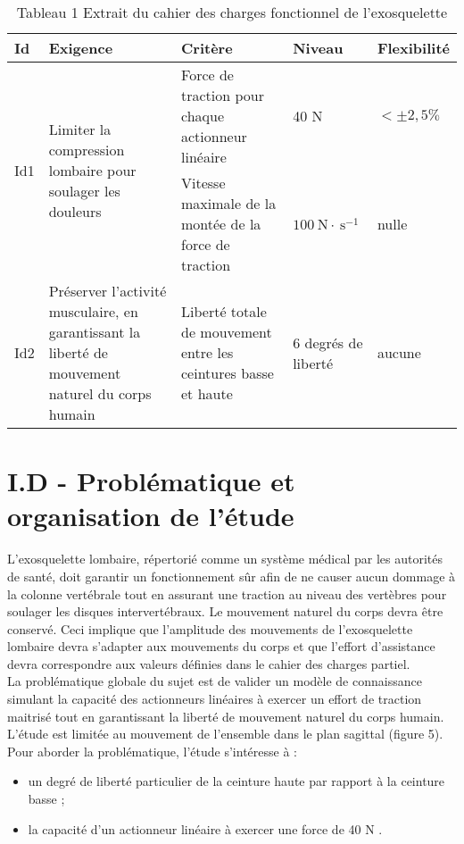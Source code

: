 \begin{table}[h]
\begin{center}
\begin{tabular}{|l|l|l|l|l|}
\hline
Id & Exigence & Critère & Niveau & Flexibilité \\
\hline
\multirow[t]{2}{*}{Id1} & \multirow[t]{2}{*}{Limiter la compression lombaire pour soulager les douleurs} & Force de traction pour chaque actionneur linéaire & 40 N & $< \pm 2,5 \%$ \\
\hline
 &  & Vitesse maximale de la montée de la force de traction & $100 \mathrm{~N} \cdot \mathrm{~s}^{-1}$ & nulle \\
\hline
Id2 & Préserver l'activité musculaire, en garantissant la liberté de mouvement naturel du corps humain & Liberté totale de mouvement entre les ceintures basse et haute & 6 degrés de liberté & aucune \\
\hline
\end{tabular}
\captionsetup{labelformat=empty}
\caption{Tableau 1 Extrait du cahier des charges fonctionnel de l'exosquelette}
\end{center}
\end{table}

\section{I.D - Problématique et organisation de l'étude}
L'exosquelette lombaire, répertorié comme un système médical par les autorités de santé, doit garantir un fonctionnement sûr afin de ne causer aucun dommage à la colonne vertébrale tout en assurant une traction au niveau des vertèbres pour soulager les disques intervertébraux. Le mouvement naturel du corps devra être conservé. Ceci implique que l'amplitude des mouvements de l'exosquelette lombaire devra s'adapter aux mouvements du corps et que l'effort d'assistance devra correspondre aux valeurs définies dans le cahier des charges partiel.\\
La problématique globale du sujet est de valider un modèle de connaissance simulant la capacité des actionneurs linéaires à exercer un effort de traction maitrisé tout en garantissant la liberté de mouvement naturel du corps humain.\\
L'étude est limitée au mouvement de l'ensemble dans le plan sagittal (figure 5). Pour aborder la problématique, l'étude s'intéresse à :

\begin{itemize}
  \item un degré de liberté particulier de la ceinture haute par rapport à la ceinture basse ;
  \item la capacité d'un actionneur linéaire à exercer une force de 40 N .
\end{itemize}

